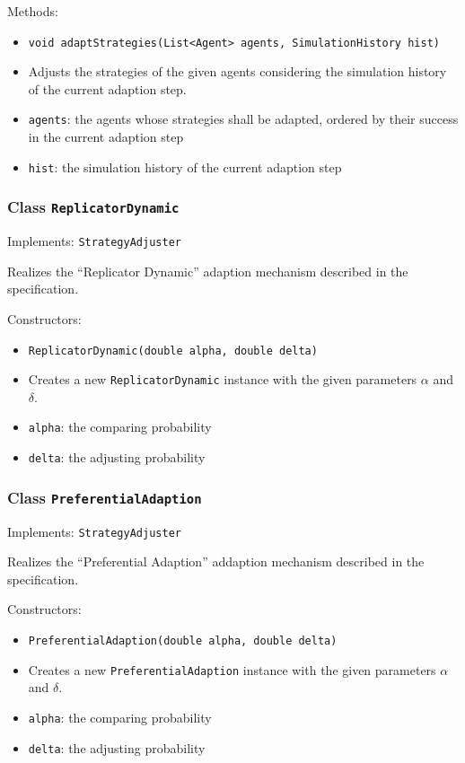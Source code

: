 \documentclass[parskip=full,11pt]{scrartcl}
\begin{document}
Methods:
\begin{itemize}\itemsep -10pt
\item \texttt{void adaptStrategies(List<Agent> agents, SimulationHistory hist)}
\item[] Adjusts the strategies of the given agents considering the simulation history of the current adaption step.
\item[] \texttt{agents}: the agents whose strategies shall be adapted, ordered by their success in the current adaption step
\item[] \texttt{hist}: the simulation history of the current adaption step
\end{itemize}

\subsubsection{Class \texttt{ReplicatorDynamic}}
Implements: \texttt{StrategyAdjuster}

Realizes the \enquote{Replicator Dynamic} adaption mechanism described in the specification.

Constructors:
\begin{itemize}\itemsep -10pt
\item \texttt{ReplicatorDynamic(double alpha, double delta)}
\item[] Creates a new \texttt{ReplicatorDynamic} instance with the given parameters \(\alpha\) and \(\delta\).
\item[] \texttt{alpha}: the comparing probability
\item[] \texttt{delta}: the adjusting probability
\end{itemize}

\subsubsection{Class \texttt{PreferentialAdaption}}
Implements: \texttt{StrategyAdjuster}

Realizes the \enquote{Preferential Adaption} addaption mechanism described in the specification.

Constructors:
\begin{itemize}\itemsep -10pt
\item \texttt{PreferentialAdaption(double alpha, double delta)}
\item[] Creates a new \texttt{PreferentialAdaption} instance with the given parameters \(\alpha\) and \(\delta\).
\item[] \texttt{alpha}: the comparing probability
\item[] \texttt{delta}: the adjusting probability
\end{itemize}
\end{document}
